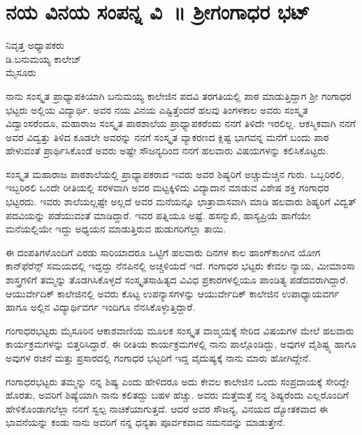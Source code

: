 {\fontsize{14}{16}\selectfont
\chapter{ನಯ ವಿನಯ ಸಂಪನ್ನ ವಿ~॥ ಶ್ರೀಗಂಗಾಧರ ಭಟ್}

\begin{center}
\smallskip

ನಿವೃತ್ತ ಅಧ್ಯಾಪಕರು\\
ಡಿ.ಬನುಮಯ್ಯ ಕಾಲೇಜ್\\
ಮೈಸೂರು
\addrule
\end{center}

ನಾನು ಸಂಸ್ಕೃತ ಪ್ರಾಧ್ಯಾಪಕಿಯಾಗಿ ಬನುಮಯ್ಯ ಕಾಲೇಜಿನ ಪದವಿ ತರಗತಿಯಲ್ಲಿ ಪಾಠ ಮಾಡುತ್ತಿದ್ದಾಗ ಶ್ರೀ ಗಂಗಾಧರ ಭಟ್ಟರು ಅಲ್ಲಿಯ ವಿದ್ಯಾರ್ಥಿ. ಅವರ ನಯ ವಿನಯ ಎಷ್ಟಿತ್ತೆಂದರೆ ಹಲವು ತಿಂಗಳಕಾಲ ಅವರು ಸಂಸ್ಕೃತ ವಿದ್ವಾಂಸರೆಂದೂ, ಮಹಾರಾಜ ಸಂಸ್ಕೃತ ಪಾಠಶಾಲೆಯ ಪ್ರಾಧ್ಯಾಪಕರೆಂದು ನನಗೆ ತಿಳಿದೇ ಇರಲಿಲ್ಲ. ಆಕಸ್ಮಿಕವಾಗಿ ನನಗೆ ಅವರ ವಿದ್ವತ್ತು ತಿಳಿದ ಕೂಡಲೇ ಅವರನ್ನು ನನಗೆ ಸಂಸ್ಕೃತ ವ್ಯಾಕರಣದ ಕ್ಲಿಷ್ಟ ಭಾಗವನ್ನ ಮನೆಗೆ ಬಂದು ಪಾಠ ಹೇಳುವಂತೆ ಪ್ರಾರ್ಥಿಸಿಕೊಂಡೆ ಅವರು ಅಷ್ಟೇ ಸೌಜನ್ಯದಿಂದ ನನಗೆ ಹಲವಾರು ವಿಷಯಗಳನ್ನು ಕಲಿಸಿಕೊಟ್ಟರು.

ಸಂಸ್ಕೃತ ಮಹಾರಾಜ ಪಾಠಶಾಲೆಯಲ್ಲಿ ಪ್ರಾಧ್ಯಾಪಕರಾದ ಇವರು ಅವರ ಶಿಷ್ಯರಿಗೆ ಅಚ್ಚುಮೆಚ್ಚಿನ ಗುರು. ಒಬ್ಬರಿರಲಿ, ಇಬ್ಬರಿರಲಿ ಒಂದೇ ರೀತಿಯಲ್ಲಿ ಸರಳವಾಗಿ ಅವರ ಮಟ್ಟಕ್ಕಿಳಿದು ವಿದ್ಯಾದಾನ ಮಾಡುವ ವಿಶೇಷ ಶಕ್ತಿ ಗಂಗಾಧರ ಭಟ್ಟರದು. ಇವರು ಶಾಲೆಯಲ್ಲಷ್ಟೇ ಅಲ್ಲದೆ ಅವರ ಮನೆಯನ್ನೂ ಛಾತ್ರಾವಾಸವಾಗಿ ಮಾಡಿ ಹಲವಾರು ಶಿಷ್ಯರಿಗೆ ವಿದ್ವತ್ ಪದವಿಯನ್ನು ಪಡೆಯುವಂತೆ ಮಾಡಿದ್ದಾರೆ. ಇವರ ಪತ್ನಿಯೂ ಅಷ್ಟೆ. ಹಸನ್ಮುಖಿ, ಹಾಸ್ಯಪ್ರಿಯೆ ಹಾಗೆಯೇ ಮನೆಯಲ್ಲಿಯೇ ಇದ್ದು ಅಧ್ಯಯನ ಮಾಡುತ್ತಿರುವ ಹುಡುಗರಿಗೆಲ್ಲಾ ತಾಯಿ.

ಈ ದಂಪತಿಗಳೊಂದಿಗೆ ಎರಡು ಸಾರಿಯಾದರೂ ಒಟ್ಟಿಗೆ ಹಲವಾರು ದಿನಗಳ ಕಾಲ ಹಾಂಗ್‍ಕಾಂಗಿನ ಯೋಗ ಕಾನ್‍ಫೆರೆನ್ಸ್ ಸಮಯದಲ್ಲಿ ಇದ್ದದ್ದು ನೆನಪಿನಲ್ಲಿ ಅಚ್ಚಳಿಯದೆ ಇದೆ. ಗಂಗಾಧರ ಭಟ್ಟರು ಕೇವಲ ನ್ಯಾಯ, ಮೀಮಾಂಸಾ ಶಾಸ್ತ್ರಗಳಿಗೆ ತಮ್ಮನ್ನು ತೊಡಗಿಸಿ\-ಕೊಳ್ಳದೆ ಸಂಸ್ಕೃತಸಾಹಿತ್ಯದ ವಿವಿಧ ಪ್ರಕಾರಗಳಲ್ಲಿಯೂ ಪಾಂಡಿತ್ಯ ಪಡೆದವರಾಗಿದ್ದಾರೆ. ಆಯುರ್ವೇದಿಕ್ ಕಾಲೇಜಿನಲ್ಲಿ ಅವರು ಕೊಟ್ಟ ಉಪನ್ಯಾಸಗಳನ್ನು ಆಯುರ್ವೇದಿಕ್ ಕಾಲೇಜಿನ ಉಪಾಧ್ಯಾಯವರ್ಗ ಹಾಗೂ ಅಲ್ಲಿನ ವಿದ್ಯಾರ್ಥಿವರ್ಗ ಇಂದಿಗೂ ನೆನಸಿಕೊಳ್ಳುತ್ತಿದ್ದಾರೆ.

ಗಂಗಾಧರಭಟ್ಟರು ಮೈಸೂರಿನ ಆಕಾಶವಾಣಿಯ ಮೂಲಕ ಸಂಸ್ಕೃತ ವಾಙ್ಮಯಕ್ಕೆ ಸೇರಿದ ವಿಷಯಗಳ ಮೇಲೆ ಹಲವಾರು ಕಾರ್ಯಕ್ರಮಗಳನ್ನು ಬಿತ್ತರಿಸಿದ್ದಾರೆ. ಈ ರೀತಿಯ ಕಾರ್ಯಕ್ರಮಗಳಲ್ಲಿ ನಾನು ಪಾಲ್ಗೊಂಡಿದ್ದು, ಅವುಗಳ ವೈಶಿಷ್ಟ್ಯ ಹಾಗೂ ಅವುಗಳ ರಚನೆ ಮತ್ತು ಪ್ರಸಾರದಲ್ಲಿ ಗಂಗಾಧರ ಭಟ್ಟರಿಗೆ ಇದ್ದ ವೈದುಷ್ಯಕ್ಕೆ ನಾನು ಮಾರು ಹೋಗಿದ್ದೇನೆ.

ಗಂಗಾಧರಭಟ್ಟರು ತಮ್ಮನ್ನು ನನ್ನ ಶಿಷ್ಯ ಎಂದು ಹೇಳಿದರೂ ಅದು ಕೇವಲ ಕಾಲೇಜಿನ ಒಂದು ಸಂಪ್ರದಾಯಕ್ಕೆ ಸೇರಿದ್ದೇ ಹೊರತು, ಅವರಿಗೆ ಶಿಷ್ಯೆಯಾಗಿ ನಾನು ಕಲಿತದ್ದು ಬಹಳ ಹೆಚ್ಚು. ಅವರು ಮತ್ತೆಮತ್ತೆ ನನ್ನ ಶಿಷ್ಯರೆಂದು ಎಲ್ಲರೊಂದಿಗೆ ಹೇಳಿಕೊಂಡಾಗಲೆಲ್ಲಾ ನನಗೆ ಸ್ವಲ್ಪ ನಾಚಿಕೆಯಾಗುತ್ತದೆ. ಆದರೆ ಅವರ ಸೌಜನ್ಯ, ವಿನಯದ ದ್ಯೋತಕವಾದ ಈ ಭಾವನೆಯನ್ನು ಕಂಡು ನಾನು ಅವರಿಗೆ ನನ್ನ ಧನ್ಯತಾ ಪೂರ್ವಕವಾದ ನಮನವನ್ನು ಮಾಡುತ್ತೇನೆ.

}

